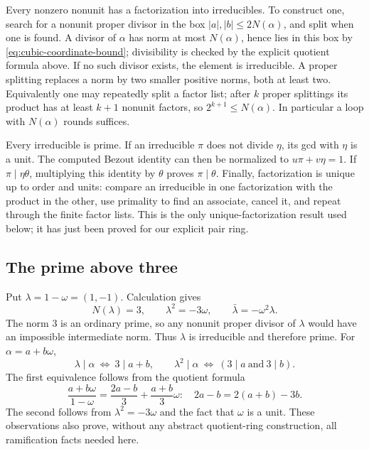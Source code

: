 Every nonzero nonunit has a factorization into irreducibles.  To construct
one, search for a nonunit proper divisor in the box
$|a|,|b|\le2N(\alpha)$, and split when one is found.  A divisor of
$\alpha$ has norm at most $N(\alpha)$, hence lies in this box by
\eqref{eq:cubic-coordinate-bound}; divisibility is checked by the explicit
quotient formula above.  If no such divisor exists, the element is
irreducible.  A proper splitting replaces a norm by two smaller positive
norms, both at least two.  Equivalently one may repeatedly split a
factor list; after $k$ proper splittings its product has at least $k+1$
nonunit factors, so $2^{k+1}\le N(\alpha)$.  In particular a loop with
$N(\alpha)$ rounds suffices.

Every irreducible is prime.  If an irreducible $\pi$ does not divide
$\eta$, its gcd with $\eta$ is a unit.  The computed Bezout identity
can then be normalized to $u\pi+v\eta=1$.  If $\pi\mid\eta\theta$,
multiplying this identity by $\theta$ proves $\pi\mid\theta$.
Finally, factorization is unique up to order and units: compare an
irreducible in one factorization with the product in the other, use
primality to find an associate, cancel it, and repeat through the finite
factor lists.  This is the only unique-factorization result used below;
it has just been proved for our explicit pair ring.

\subsection{The prime above three}

Put $\lambda=1-\omega=(1,-1)$.  Calculation gives
\[
 N(\lambda)=3,\qquad \lambda^2=-3\omega,
 \qquad \bar\lambda=-\omega^2\lambda.
\]
The norm $3$ is an ordinary prime, so any nonunit proper divisor of
$\lambda$ would have an impossible intermediate norm.  Thus $\lambda$
is irreducible and therefore prime.  For $\alpha=a+b\omega$,
\begin{equation}
 \lambda\mid\alpha\ \Longleftrightarrow\ 3\mid a+b,
 \qquad
 \lambda^2\mid\alpha\ \Longleftrightarrow\ (3\mid a\ \text{and}\ 3\mid b).
 \label{eq:cubic-lambda}
\end{equation}
The first equivalence follows from the quotient formula
\[
 \frac{a+b\omega}{1-\omega}
 =\frac{2a-b}{3}+\frac{a+b}{3}\omega:
 \quad 2a-b=2(a+b)-3b.
\]
The second follows from $\lambda^2=-3\omega$ and the fact that
$\omega$ is a unit.  These observations also prove, without any
abstract quotient-ring construction, all ramification facts needed here.

